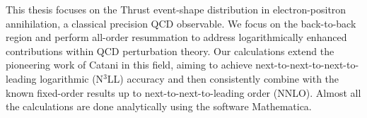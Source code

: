 \documentclass[10pt,english,openany]{book}
\begin{document}
\frontispiece

\beforepreface %

This thesis focuses on the Thrust event-shape distribution in electron-positron 
annihilation, a classical precision QCD observable. We focus on the back-to-back region
and perform all-order resummation to address logarithmically enhanced contributions 
within QCD perturbation theory. Our calculations extend the pioneering work of Catani in this field,
aiming to achieve next-to-next-to-next-to-leading logarithmic (N$^3$LL) accuracy 
and then consistently combine with the known fixed-order results up to next-to-next-to-leading order 
(NNLO). Almost all the calculations are done analytically using the software Mathematica.


\tableofcontents
{}
\setcounter{page}{1}

\allowdisplaybreaks %

 











\appendix



\printbibliography
\end{document}
